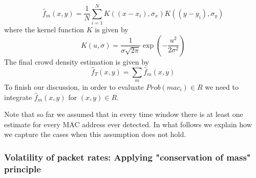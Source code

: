 \documentclass[10pt,a4paper]{article}
\begin{document}
\begin{equation}
\hat{f}_{m}(x,y)=\frac{1}{N}\sum_{i=1}^{N}K((x-x_{i}),\sigma_{x}) K((y-y_{i}),\sigma_{y})
\label{kde}
\end{equation}
where the kernel function $K$ is given by
\begin{equation}
K(u,\sigma)=\frac{1}{\sigma\sqrt{2\pi}}\exp(-\frac{u^2}{2\sigma^2})
\end{equation}
The final crowd density estimation is given by
\begin{equation}
\hat{f}_{T}(x,y)=\sum_{m}\hat{f}_{m}(x,y)
\label{total}
\end{equation}
To finish our  discussion, in order to evaluate $Prob(mac_i) \in R$ we need to integrate $\hat{f}_{m}(x,y)$ for $(x,y) \in R$. 

Note that so far we assumed that in every time window there is at least one estimate for every MAC address ever detected. In what follows we explain how we capture the cases when this assumption does not hold. 

\subsubsection{Volatility of packet rates: Applying "conservation of mass" principle }
\end{document}

